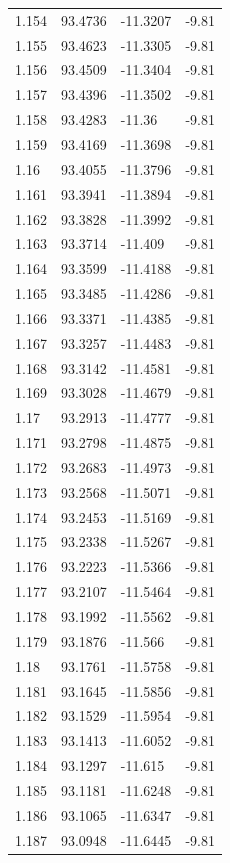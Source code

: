 \begin{tabular}{llll}
1.154 & 93.4736 & -11.3207 & -9.81 \\
1.155 & 93.4623 & -11.3305 & -9.81 \\
1.156 & 93.4509 & -11.3404 & -9.81 \\
1.157 & 93.4396 & -11.3502 & -9.81 \\
1.158 & 93.4283 & -11.36 & -9.81 \\
1.159 & 93.4169 & -11.3698 & -9.81 \\
1.16 & 93.4055 & -11.3796 & -9.81 \\
1.161 & 93.3941 & -11.3894 & -9.81 \\
1.162 & 93.3828 & -11.3992 & -9.81 \\
1.163 & 93.3714 & -11.409 & -9.81 \\
1.164 & 93.3599 & -11.4188 & -9.81 \\
1.165 & 93.3485 & -11.4286 & -9.81 \\
1.166 & 93.3371 & -11.4385 & -9.81 \\
1.167 & 93.3257 & -11.4483 & -9.81 \\
1.168 & 93.3142 & -11.4581 & -9.81 \\
1.169 & 93.3028 & -11.4679 & -9.81 \\
1.17 & 93.2913 & -11.4777 & -9.81 \\
1.171 & 93.2798 & -11.4875 & -9.81 \\
1.172 & 93.2683 & -11.4973 & -9.81 \\
1.173 & 93.2568 & -11.5071 & -9.81 \\
1.174 & 93.2453 & -11.5169 & -9.81 \\
1.175 & 93.2338 & -11.5267 & -9.81 \\
1.176 & 93.2223 & -11.5366 & -9.81 \\
1.177 & 93.2107 & -11.5464 & -9.81 \\
1.178 & 93.1992 & -11.5562 & -9.81 \\
1.179 & 93.1876 & -11.566 & -9.81 \\
1.18 & 93.1761 & -11.5758 & -9.81 \\
1.181 & 93.1645 & -11.5856 & -9.81 \\
1.182 & 93.1529 & -11.5954 & -9.81 \\
1.183 & 93.1413 & -11.6052 & -9.81 \\
1.184 & 93.1297 & -11.615 & -9.81 \\
1.185 & 93.1181 & -11.6248 & -9.81 \\
1.186 & 93.1065 & -11.6347 & -9.81 \\
1.187 & 93.0948 & -11.6445 & -9.81 \\

\end{tabular}
